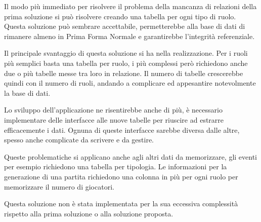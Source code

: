 Il modo più immediato per risolvere il problema della mancanza di relazioni della prima soluzione si può risolvere creando una tabella per ogni tipo di ruolo. Questa soluzione può sembrare accettabile, permetterebbe alla base di dati di rimanere almeno in Prima Forma Normale e garantirebbe l'integrità referenziale.

Il principale svantaggio di questa soluzione si ha nella realizzazione. Per i ruoli più semplici basta una tabella per ruolo, i più complessi però richiedono anche due o più tabelle messe tra loro in relazione. Il numero di tabelle crescerebbe quindi con il numero di ruoli, andando a complicare ed appesantire notevolmente la base di dati.

Lo sviluppo dell'applicazione ne risentirebbe anche di più, è necessario implementare delle interfacce alle nuove tabelle per riuscire ad estrarre efficacemente i dati. Ognuna di queste interfacce sarebbe diversa dalle altre, spesso anche complicate da scrivere e da gestire. 

Queste problematiche si applicano anche agli altri dati da memorizzare, gli eventi per esempio richiedono una tabella per tipologia. Le informazioni per la generazione di una partita richiedono una colonna in più per ogni ruolo per memorizzare il numero di giocatori. 

Questa soluzione non è stata implementata per la sua eccessiva complessità rispetto alla prima soluzione o alla soluzione proposta.